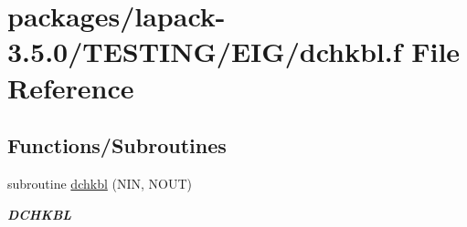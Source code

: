 \hypertarget{dchkbl_8f}{}\section{packages/lapack-\/3.5.0/\+T\+E\+S\+T\+I\+N\+G/\+E\+I\+G/dchkbl.f File Reference}
\label{dchkbl_8f}
\subsection*{Functions/\+Subroutines}
\begin{DoxyCompactItemize}
\item 
subroutine \hyperlink{group__double__eig_gad48bef9c53d7828ee7b25c9ccf56fed9}{dchkbl} (N\+I\+N, N\+O\+U\+T)
\begin{DoxyCompactList}\small\item\em {\bfseries D\+C\+H\+K\+B\+L} \end{DoxyCompactList}\end{DoxyCompactItemize}
